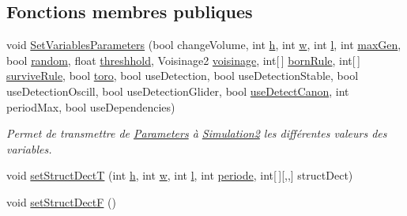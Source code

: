 \subsection*{Fonctions membres publiques}
\begin{DoxyCompactItemize}
\item 
void \mbox{\hyperlink{class_simulation2_ac4ade01f70c0b453d51a62be9d50e2ae}{Set\+Variables\+Parameters}} (bool change\+Volume, int \mbox{\hyperlink{class_simulation2_af29275bd4a0258f40145571332bcbfe7}{h}}, int \mbox{\hyperlink{class_simulation2_a2c5f8ea5bdf25da6011b47228df3fbf8}{w}}, int \mbox{\hyperlink{class_simulation2_a3c066b4b23080953fcce80b1fc2c56b4}{l}}, int \mbox{\hyperlink{class_simulation2_a37f3b0f46bf617f526d81ca01fac23e2}{max\+Gen}}, bool \mbox{\hyperlink{class_simulation2_a48db27680b5deaf8e913924a75b6916c}{random}}, float \mbox{\hyperlink{class_simulation2_a17803d7383b2bbd62c96572cd3370d06}{threshhold}}, Voisinage2 \mbox{\hyperlink{class_simulation2_a0f278d8340b3920e0aeb9aafccf9daec}{voisinage}}, int\mbox{[}$\,$\mbox{]} \mbox{\hyperlink{class_simulation2_a4cb820ddd8658778f36723fa0e5dec50}{born\+Rule}}, int\mbox{[}$\,$\mbox{]} \mbox{\hyperlink{class_simulation2_a8e264ac14adf969b72d37a3006c9981f}{survive\+Rule}}, bool \mbox{\hyperlink{class_simulation2_abefcdee48ca39bb47d28984bcf033ca4}{toro}}, bool use\+Detection, bool use\+Detection\+Stable, bool use\+Detection\+Oscill, bool use\+Detection\+Glider, bool \mbox{\hyperlink{class_simulation2_ae390b35abb2471abc8e257633896404a}{use\+Detect\+Canon}}, int period\+Max, bool use\+Dependencies)
\begin{DoxyCompactList}\small\item\em Permet de transmettre de \mbox{\hyperlink{class_parameters}{Parameters}} à \mbox{\hyperlink{class_simulation2}{Simulation2}} les différentes valeurs des variables. \end{DoxyCompactList}\item 
void \mbox{\hyperlink{class_simulation2_a4d1dfe65ceaf3256baba8a57efdabdd2}{set\+Struct\+DectT}} (int \mbox{\hyperlink{class_simulation2_af29275bd4a0258f40145571332bcbfe7}{h}}, int \mbox{\hyperlink{class_simulation2_a2c5f8ea5bdf25da6011b47228df3fbf8}{w}}, int \mbox{\hyperlink{class_simulation2_a3c066b4b23080953fcce80b1fc2c56b4}{l}}, int \mbox{\hyperlink{class_simulation2_a65e50727f755df30407afa8b931e10c0}{periode}}, int\mbox{[}$\,$\mbox{]}\mbox{[},,\mbox{]} struct\+Dect)
\item 
void \mbox{\hyperlink{class_simulation2_a68881bc6b234067ccb956b04d1f59e90}{set\+Struct\+DectF}} ()
\item 

\end{DoxyCompactItemize}
